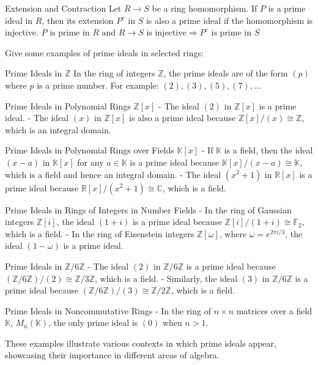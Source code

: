 Extension and Contraction
Let \( R \to S \) be a ring homomorphism. If \( P \) is a prime ideal in \( R \), then its extension \( P^e \) in \( S \) is also a prime ideal if the homomorphism is injective.
\(
P \text{ is prime in } R \text{ and } R \to S \text{ is injective} \Rightarrow P^e \text{ is prime in } S
\)


Give some examples of prime ideals in selected rings:

Prime Ideals in \(\mathbb{Z}\)
In the ring of integers \(\mathbb{Z}\), the prime ideals are of the form \( (p) \) where \( p \) is a prime number. For example:
\(
(2), (3), (5), (7), \ldots
\)

Prime Ideals in Polynomial Rings \(\mathbb{Z}[x]\)
- The ideal \((2)\) in \(\mathbb{Z}[x]\) is a prime ideal.
- The ideal \((x)\) in \(\mathbb{Z}[x]\) is also a prime ideal because \(\mathbb{Z}[x]/(x) \cong \mathbb{Z}\), which is an integral domain.

Prime Ideals in Polynomial Rings over Fields \(\mathbb{K}[x]\)
- If \(\mathbb{K}\) is a field, then the ideal \((x-a)\) in \(\mathbb{K}[x]\) for any \(a \in \mathbb{K}\) is a prime ideal because \(\mathbb{K}[x]/(x-a) \cong \mathbb{K}\), which is a field and hence an integral domain.
- The ideal \((x^2 + 1)\) in \(\mathbb{R}[x]\) is a prime ideal because \(\mathbb{R}[x]/(x^2 + 1) \cong \mathbb{C}\), which is a field.

Prime Ideals in Rings of Integers in Number Fields
- In the ring of Gaussian integers \(\mathbb{Z}[i]\), the ideal \((1+i)\) is a prime ideal because \(\mathbb{Z}[i]/(1+i) \cong \mathbb{F}_2\), which is a field.
- In the ring of Eisenstein integers \(\mathbb{Z}[\omega]\), where \(\omega = e^{2\pi i / 3}\), the ideal \((1 - \omega)\) is a prime ideal.

Prime Ideals in \(\mathbb{Z}/6\mathbb{Z}\)
- The ideal \((2)\) in \(\mathbb{Z}/6\mathbb{Z}\) is a prime ideal because \((\mathbb{Z}/6\mathbb{Z})/(2) \cong \mathbb{Z}/3\mathbb{Z}\), which is a field.
- Similarly, the ideal \((3)\) in \(\mathbb{Z}/6\mathbb{Z}\) is a prime ideal because \((\mathbb{Z}/6\mathbb{Z})/(3) \cong \mathbb{Z}/2\mathbb{Z}\), which is a field.

Prime Ideals in Noncommutative Rings
- In the ring of \(n \times n\) matrices over a field \(\mathbb{K}\), \(M_n(\mathbb{K})\), the only prime ideal is \((0)\) when \(n > 1\).

These examples illustrate various contexts in which prime ideals appear, showcasing their importance in different areas of algebra.


